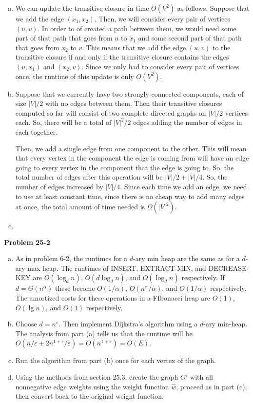 \documentclass{article}
\begin{document}
\begin{enumerate}[a.]
\item
We can update the transitive closure in time $O(V^2)$ as follows. Suppose that we add the edge $(x_1,x_2)$. Then, we will consider every pair of vertices $(u,v)$. In order to of created a path between them, we would need some part of that path that goes from $u$ to $x_1$ and some second part of that path that goes from $x_2$ to $v$. This means that we add the edge $(u,v)$ to the transitive closure if and only if the transitive closure contains the edges $(u,x_1)$ and $(x_2,v)$. Since we only had to consider every pair of vertices once, the runtime of this update is only $O(V^2)$.
\item
Suppose that we currently have two strongly connected components, each of size $|V|/2$ with no edges between them. Then their transitive closures computed so far will consist of two complete directed graphs on $|V|/2$ vertices each. So, there will be a total of $|V|^2/2$ edges adding the number of edges in each together.

Then, we add a single edge from one component to the other. This will mean that every vertex in the component the edge is coming from will have an edge going to every vertex in the component that the edge is going to. So, the total number of edges after this operation will be $|V|/2 +|V|/4$. So, the number of edges increased by $|V|/4$. Since each time we add an edge, we need to use at least constant time, since there is no cheap way to add many edges at once, the total amount of time needed is $\Omega(|V|^2)$.

\item 


\end{enumerate}

\noindent\textbf{Problem 25-2}\\

\begin{enumerate}[a.]
\item  As in problem 6-2, the runtimes for a $d$-ary min heap are the same as for a $d$-ary max heap.  The runtimes of INSERT, EXTRACT-MIN, and DECREASE-KEY are $O(\log_d n)$, $O(d\log_d n)$, and $O(\log_d n)$ respectively.  If $d = \Theta(n^{\alpha})$ these become $O(1/\alpha)$, $O(n^\alpha / \alpha)$, and $O(1/\alpha)$ respectively.  The amortized costs for these operations in a FIbonacci heap are $O(1)$, $O(\lg n)$, and $O(1)$ respectively.

\item Choose $d = n^\varepsilon$.  Then implement Dijkstra's algorithm using a $d$-ary min-heap.  The analysis from part (a) tells us that the runtime will be $O(n/\varepsilon + 2n^{1 + \varepsilon}/\varepsilon) = O(n^{1 + \varepsilon}) = O(E)$.

\item Run the algorithm from part (b) once for each vertex of the graph. 

\item Using the methods from section 25.3, create the graph $G'$ with all nonnegative edge weights using the weight function $\hat{w}$, proceed as in part (c), then convert back to the original weight function. 
\end{enumerate}
\end{document}
